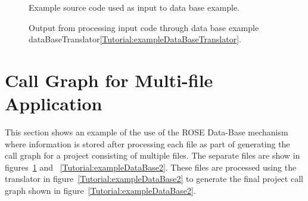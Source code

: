 \begin{figure}[!h]
{\indent
{\mySmallFontSize


\begin{latexonly}
   
\end{latexonly}

\begin{htmlonly}
   
\end{htmlonly}

}
}
\caption{Example source code used as input to data base example.}
\label{Tutorial:exampleDataBase1}
\end{figure}

\begin{figure}[!h]
{\indent
{\mySmallFontSize


\begin{latexonly}
   
\end{latexonly}

\begin{htmlonly}
   
\end{htmlonly}

}
}
\caption{Output from processing input code through data base example dataBaseTranslator\ref{Tutorial:exampleDataBaseTranslator}.}
\label{Tutorial:exampleTemplate1}
\end{figure}


\section{Call Graph for Multi-file Application}

   This section shows an example of the use of the ROSE Data-Base mechanism
where information is stored after processing each file as part of generating the
call graph for a project consisting of multiple files.  The separate files
are show in figures~\ref{Tutorial:exampleDataBase1} and ~\ref{Tutorial:exampleDataBase2}.
These files are processed using the translator in figure~\ref{Tutorial:exampleDataBase2}
to generate the final project call graph shown in figure~\ref{Tutorial:exampleDataBase2}.

